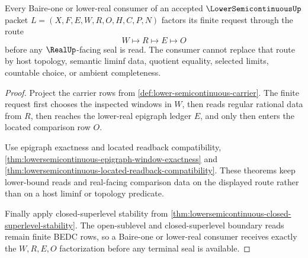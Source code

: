 \begin{theorem}
\label{thm:lowersemicontinuous-baire-window-factorization}
Every Baire-one or lower-real consumer of an accepted $\LowerSemicontinuousUp$ packet $L=(X,F,E,W,R,O,H,C,P,N)$ factors its finite request through the route
$$
W \longmapsto R \longmapsto E \longmapsto O
$$
before any $\RealUp$-facing seal is read. The consumer cannot replace that route by host topology, semantic liminf data, quotient equality, selected limits, countable choice, or ambient completeness.
\end{theorem}
\begin{proof}
Project the carrier rows from \autoref{def:lower-semicontinuous-carrier}. The finite request first chooses the inspected windows in $W$, then reads regular rational data from $R$, then reaches the lower-real epigraph ledger $E$, and only then enters the located comparison row $O$.

Use epigraph exactness and located readback compatibility, \autoref{thm:lowersemicontinuous-epigraph-window-exactness} and \autoref{thm:lowersemicontinuous-located-readback-compatibility}. These theorems keep lower-bound reads and real-facing comparison data on the displayed route rather than on a host liminf or topology predicate.

Finally apply closed-superlevel stability from \autoref{thm:lowersemicontinuous-closed-superlevel-stability}. The open-sublevel and closed-superlevel boundary reads remain finite BEDC rows, so a Baire-one or lower-real consumer receives exactly the $W,R,E,O$ factorization before any terminal seal is available.
\end{proof}

